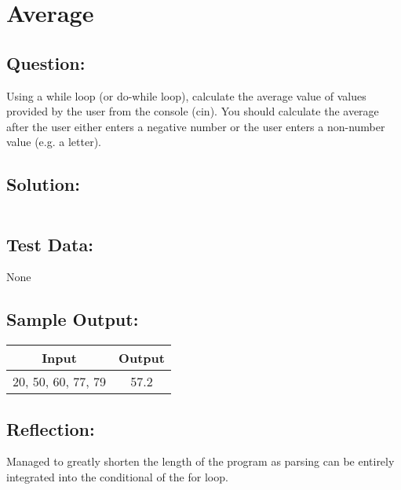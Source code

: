 \documentclass[main.tex]{subfiles}
\begin{document}
    \section{Average}
        \subsection*{Question:}
        Using a while loop (or do-while loop), calculate the average value of values provided by the user from the console (cin).
        You should calculate the average after the user either enters a negative number or the user enters a non-number value (e.g. a letter).
            
        \subsection*{Solution:}
            \inputminted{cpp}{../Tasks/06-Average/Average.cpp}%

        \subsection*{Test Data:}
            None
        
        \subsection*{Sample Output:}
            \begin{center}
                \begin{tabular}{c c}
                    \hline
                    \textbf{Input} & \textbf{Output} \\
                    \hline
                    20, 50, 60, 77, 79 & 57.2 \\
                \end{tabular}
            \end{center}

        \subsection*{Reflection:}
            Managed to greatly shorten the length of the program as parsing can
            be entirely integrated into the conditional of the for loop.
\end{document}
